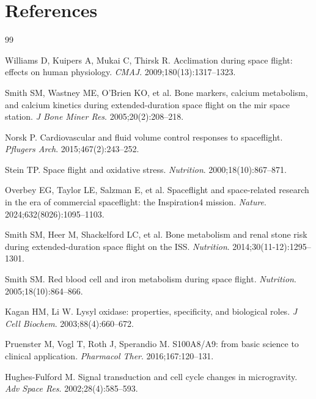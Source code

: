 \documentclass[11pt,a4paper]{article}
\begin{document}
\section*{References}

\begin{thebibliography}{99}

Williams D, Kuipers A, Mukai C, Thirsk R. Acclimation during space flight: effects on human physiology. \textit{CMAJ}. 2009;180(13):1317--1323.

Smith SM, Wastney ME, O'Brien KO, et al. Bone markers, calcium metabolism, and calcium kinetics during extended-duration space flight on the mir space station. \textit{J Bone Miner Res}. 2005;20(2):208--218.

Norsk P. Cardiovascular and fluid volume control responses to spaceflight. \textit{Pflugers Arch}. 2015;467(2):243--252.

Stein TP. Space flight and oxidative stress. \textit{Nutrition}. 2000;18(10):867--871.

Overbey EG, Taylor LE, Salzman E, et al. Spaceflight and space-related research in the era of commercial spaceflight: the Inspiration4 mission. \textit{Nature}. 2024;632(8026):1095--1103.

Smith SM, Heer M, Shackelford LC, et al. Bone metabolism and renal stone risk during extended-duration space flight on the ISS. \textit{Nutrition}. 2014;30(11-12):1295--1301.

Smith SM. Red blood cell and iron metabolism during space flight. \textit{Nutrition}. 2005;18(10):864--866.

Kagan HM, Li W. Lysyl oxidase: properties, specificity, and biological roles. \textit{J Cell Biochem}. 2003;88(4):660--672.

Pruenster M, Vogl T, Roth J, Sperandio M. S100A8/A9: from basic science to clinical application. \textit{Pharmacol Ther}. 2016;167:120--131.

Hughes-Fulford M. Signal transduction and cell cycle changes in microgravity. \textit{Adv Space Res}. 2002;28(4):585--593.

\end{thebibliography}
\end{document}
